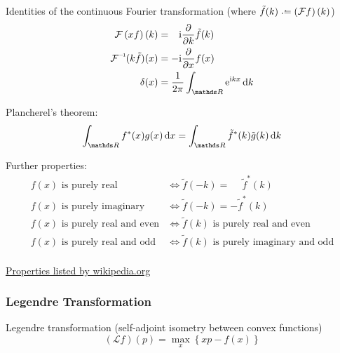 			\noindent
			Identities of the continuous Fourier transformation (where $\tilde{f}(k) \defeq \left(\mathcal{F}f\right)(k)$)
			\begin{equation}
				\begin{aligned}
					\mathcal{F}\left(xf\right)(k) &= \phantom{-}\i \pdv{k}\tilde{f}(k) \\
					\inv{\mathcal{F}}(k\tilde{f})(x) &= -\i\pdv{x}f(x) \\
					\delta(x) &= \frac{1}{2\pi}\int_{\reals}\ex^{\i kx}\dd{k}
					\label{Eq:FourierIdentities}
				\end{aligned}
			\end{equation}

			\noindent
			Plancherel's theorem:
			\begin{equation}
				\int_{\reals } f^{*}(x) g(x)\dd{x} =
				\int_{\reals }\tilde{f}^{*}(k)\tilde{g}(k)\dd{k}
			\end{equation}

			\noindent
			Further properties:
			\begin{equation}
				\begin{aligned}
					f(x)\text{ is purely real} &\iff \tilde{f}(-k) = \phantom{-}\tilde{f}^*(k) \\
					f(x)\text{ is purely imaginary} &\iff \tilde{f}(-k) = -\tilde{f}^*(k) \\
					f(x)\text{ is purely real and even} &\iff \tilde{f}(k)\text{ is purely real and even} \\
					f(x)\text{ is purely real and odd} &\iff \tilde{f}(k)\text{ is purely imaginary and odd} \\
				\end{aligned}
			\end{equation}

			\noindent
			\href{https://en.wikipedia.org/wiki/Fourier_transform#Functional_relationships,_one-dimensional}{Properties listed by wikipedia.org}

		\subsubsection{Legendre Transformation}
			\noindent
			Legendre transformation (self-adjoint isometry between convex functions)
			\begin{equation}
				(\mathcal{L}f)(p)=\max_x\left\lbrace xp-f(x) \right\rbrace
			\end{equation}


